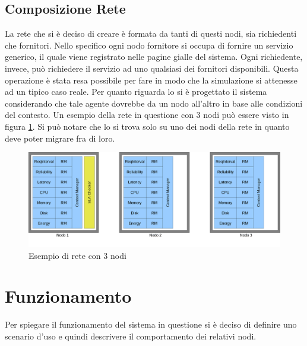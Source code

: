 \subsection{Composizione Rete}
La rete che si è deciso di creare è formata da tanti di questi nodi, sia richiedenti che fornitori. Nello specifico ogni nodo fornitore si occupa di fornire un servizio generico, il quale viene registrato nelle pagine gialle del sistema. Ogni richiedente, invece, può richiedere il servizio ad uno qualsiasi dei fornitori disponibili. Questa operazione è stata resa possibile per fare in modo che la simulazione si attenesse ad un tipico caso reale. Per quanto riguarda lo  si è progettato il sistema considerando che tale agente dovrebbe  da un nodo all'altro in base alle condizioni del contesto. Un esempio della rete in questione con 3 nodi può essere visto in figura \ref{rete}. Si può notare che lo  si trova solo su uno dei nodi della rete in quanto deve poter migrare fra di loro.
\begin{figure}[H]
\begin{center}
\includegraphics[scale=0.23]{etc/rete.png}
\caption{Esempio di rete con 3 nodi}
\label{rete}
\end{center}
\end{figure}
\section{Funzionamento}
Per spiegare il funzionamento del sistema in questione si è deciso di definire uno scenario d'uso e quindi descrivere il comportamento dei relativi nodi.
